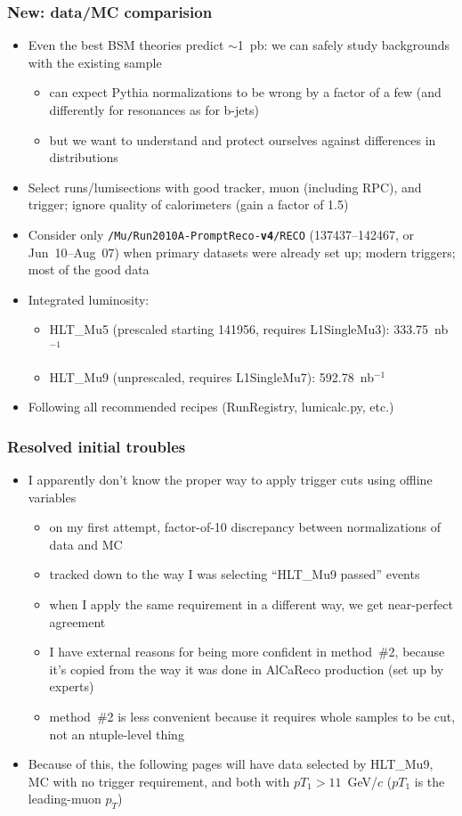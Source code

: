 \documentclass[compress]{beamer}
\begin{document}
\begin{frame}
\frametitle{New: data/MC comparision}
\begin{itemize}
\item Even the best BSM theories predict $\sim$1~pb: we can safely study backgrounds with the existing sample
\begin{itemize}
\item can expect Pythia normalizations to be wrong by a factor of a
  few (and differently for resonances as for b-jets)
\item but we want to understand and protect ourselves against
  differences in distributions
\end{itemize}

\item Select runs/lumisections with good tracker, muon (including RPC), and trigger; ignore quality of calorimeters (gain a factor of 1.5)
\item Consider only {\tt /Mu/Run2010A-PromptReco-{\bf v4}/RECO}
  (137437--142467, or Jun~10--Aug~07) when primary datasets were already set up; modern triggers; most of the good data
\item Integrated luminosity:
\begin{itemize}
\item HLT\_Mu5 (prescaled starting 141956, requires L1SingleMu3): 333.75~nb$^{-1}$
\item HLT\_Mu9 (unprescaled, requires L1SingleMu7): 592.78~nb$^{-1}$
\end{itemize}
\item Following all recommended recipes (RunRegistry, lumicalc.py, etc.)
\end{itemize}
\end{frame}

\begin{frame}
\frametitle{Resolved initial troubles}
\begin{itemize}
\item I apparently don't know the proper way to apply trigger cuts using offline variables
\begin{itemize}
\item on my first attempt, factor-of-10 discrepancy between normalizations of data and MC
\item tracked down to the way I was selecting ``HLT\_Mu9 passed'' events
\item when I apply the same requirement in a different way, we get near-perfect agreement
\item I have external reasons for being more confident in method~\#2,
because it's copied from the way it was done in AlCaReco production
(set up by experts)
\item method~\#2 is less convenient because it requires whole samples
to be cut, not an ntuple-level thing
\end{itemize}

\item Because of this, the following pages will have data selected by
HLT\_Mu9, MC with no trigger requirement, and both with $pT_1 >
11$~GeV/$c$ ($pT_1$ is the leading-muon $p_T$)
\end{itemize}
\end{frame}
\end{document}
